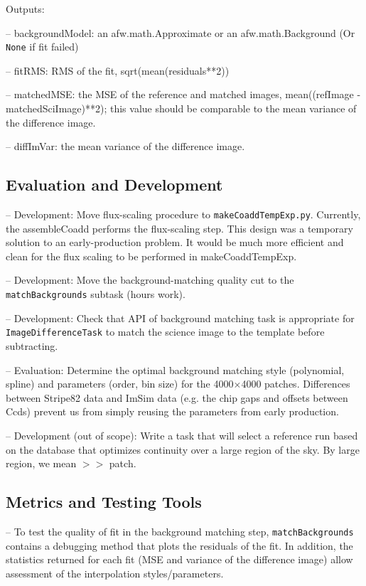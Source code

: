 \documentclass[prd, nofootinbib, floatfix, 11pt,tightenlines,times]{article}
\begin{document}
Outputs:  

-- backgroundModel: an afw.math.Approximate or an afw.math.Background (Or {\tt None} if fit failed) 

-- fitRMS: RMS of the fit, sqrt(mean(residuals**2))

-- matchedMSE: the MSE of the reference and matched images, mean((refImage - matchedSciImage)**2); 
   this value should be comparable to the mean variance of the difference image.

-- diffImVar: the mean variance of the difference image.

\subsection{Evaluation and Development}

-- Development: Move flux-scaling procedure to {\tt makeCoaddTempExp.py}.  Currently, the assembleCoadd performs the flux-scaling step. This design was a temporary solution to an early-production problem.  It would be much more efficient and clean for the flux scaling to be performed in makeCoaddTempExp.

-- Development:  Move the background-matching quality cut to the {\tt matchBackgrounds} subtask (hours work).

-- Development:  Check that API of background matching task is appropriate for {\tt ImageDifferenceTask} to match the science image to the template before subtracting. 

-- Evaluation: Determine the optimal background matching style (polynomial, spline) and parameters (order, bin size) for the 4000$\times$4000 patches. Differences between Stripe82 data and ImSim data (e.g. the chip gaps and offsets between Ccds) prevent us from simply reusing the parameters from early production.

-- Development (out of scope): Write a task that will select a reference run based on the database that optimizes continuity over a large region of the sky. By large region, we mean $>>$ patch. 

\subsection{Metrics and Testing Tools}

-- To test the quality of fit in the background matching step, {\tt matchBackgrounds} contains a debugging method that plots the residuals of the fit.  In addition, the statistics returned for each fit (MSE and variance of the difference image) allow assessment of the interpolation styles/parameters.
\end{document}

